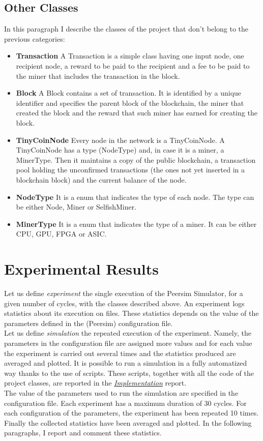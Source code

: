 \documentclass{article}
\begin{document}
\subsection{Other Classes} 
In this paragraph I describe the classes of the project that don't belong to the previous categories:
\begin{itemize}
\item \textbf{Transaction} A Transaction is a simple class having one input node, one recipient node, a reward to be paid to the recipient and a fee to be paid to the miner that includes the transaction in the block.
\item \textbf{Block} A Block contains a set of transaction. It is identified by a unique identifier and specifies the parent block of the blockchain, the miner that created the block and the reward that such miner has earned for creating the block.
\item \textbf{TinyCoinNode} Every node in the network is a TinyCoinNode. A TinyCoinNode has a type (NodeType) and, in case it is a miner, a MinerType. Then it maintains a copy of the public blockchain, a transaction pool holding the unconfirmed transactions (the ones not yet inserted in a blockchain block) and the current balance of the node.
\item \textbf{NodeType} It is a enum that indicates the type of each node. The type can be either Node, Miner or SelfishMiner.
\item \textbf{MinerType} It is a enum that indicates the type of a miner. It can be either CPU, GPU, FPGA or ASIC.
\end{itemize}


\section{Experimental Results}
Let us define \textit{experiment} the single execution of the Peersim Simulator, for a given number of cycles, with the classes described above. An experiment logs statistics about its execution on files. These statistics depends on the value of the parameters defined in the (Peersim) configuration file. \\
Let us define \textit{simulation} the repeated execution of the experiment. Namely, the parameters in the configuration file are assigned more values and for each value the experiment is carried out several times and the statistics produced are averaged and plotted. It is possible to run a simulation in a fully automatized way thanks to the use of scripts. These scripts, together with all the code of the project classes, are reported in the \href{https://github.com/Balzu/TinyCoin/blob/master/docs/implementation.pdf}{\textit{Implementation}} report. \\
The value of the parameters used to run the simulation are specified in the configuration file. Each experiment has a maximum duration of 30 cycles. For each configuration of the parameters, the experiment has been repeated 10 times. Finally the collected statistics have been averaged and plotted. In the following paragraphs, I report and comment these statistics.
\end{document}
